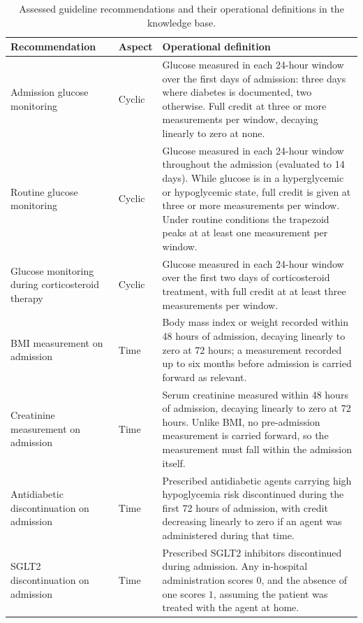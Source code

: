 \begin{table}[htbp]
\centering
\singlespacing
\caption{Assessed guideline recommendations and their operational definitions
in the knowledge base.}
\label{tab:qatp-definitions}
\small
\begin{tabularx}{\textwidth}{
>{\raggedright\arraybackslash}p{}
l
>{\raggedright\arraybackslash}X
}
\toprule
Recommendation & Aspect & Operational definition \\
\midrule

Admission glucose monitoring & Cyclic &
Glucose measured in each 24-hour window over the first days of admission:
three days where diabetes is documented, two otherwise. Full credit at three
or more measurements per window, decaying linearly to zero at none. \\

Routine glucose monitoring & Cyclic &
Glucose measured in each 24-hour window throughout the admission (evaluated
to 14 days). While glucose is in a hyperglycemic or hypoglycemic state, full
credit is given at three or more measurements per window. Under routine
conditions the trapezoid peaks at at least one measurement per window. \\

Glucose monitoring during corticosteroid therapy & Cyclic &
Glucose measured in each 24-hour window over the first two days of
corticosteroid treatment, with full credit at at least three measurements per
window. \\

BMI measurement on admission & Time &
Body mass index or weight recorded within 48 hours of admission, decaying
linearly to zero at 72 hours; a measurement recorded up to six months before
admission is carried forward as relevant. \\

Creatinine measurement on admission & Time &
Serum creatinine measured within 48 hours of admission, decaying linearly to
zero at 72 hours. Unlike BMI, no pre-admission measurement is carried
forward, so the measurement must fall within the admission itself. \\

Antidiabetic discontinuation on admission & Time &
Prescribed antidiabetic agents carrying high hypoglycemia risk discontinued
during the first 72 hours of admission, with credit decreasing linearly to
zero if an agent was administered during that time. \\

SGLT2 discontinuation on admission & Time &
Prescribed SGLT2 inhibitors discontinued during admission. Any in-hospital
administration scores $0$, and the absence of one scores $1$, assuming the
patient was treated with the agent at home. \\


\end{tabularx}
\end{table}
